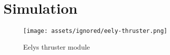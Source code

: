 \chapter{Simulation}

\begin{figure}[h!]
    \centering
    \texttt{[image: assets/ignored/eely-thruster.png]}
    \caption{Eelys thruster module}
    \label{fig:module:thruster}
\end{figure}

